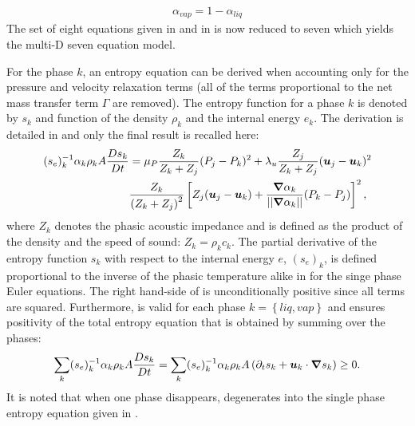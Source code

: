 %
\begin{align}
 \alpha_{vap}= 1 - \alpha_{liq}
\end{align}
%
The set of eight equations given in  and in  is now reduced to seven which yields the multi-D seven equation model.

For the phase $k$, an entropy equation can be derived when accounting only for the pressure and velocity relaxation terms (all of the terms proportional to the net mass transfer term $\Gamma$ are removed). The entropy function for a phase $k$ is denoted by $s_k$ and function of the density $\rho_k$ and the internal energy $e_k$. The derivation is detailed in  and only the final result is recalled here:
%
\begin{align}\label{eq:ent-eqn-7-eqn-model}
(s_{e})_k^{-1} \alpha_k \rho_k A \frac{Ds_k}{Dt} &= \mu_P \frac{Z_k}{Z_k+Z_j} (P_j - P_k)^2 + \lambda_u \frac{Z_j}{Z_k+Z_j} (\boldsymbol u_j -\boldsymbol u_k)^2 \nonumber
\\
& \frac{Z_k}{\left( Z_k+Z_j \right)^2} \left[ Z_j (\boldsymbol u_j-\boldsymbol u_k)+\frac{\boldsymbol{\nabla} \alpha_k}{|| \boldsymbol{\nabla} \alpha_k ||}(P_k-P_j)\right]^2,
\end{align}
where $Z_{k}$ denotes the phasic acoustic impedance and is defined as the product of the density and the speed of sound: $Z_k = \rho_k c_k$. The partial derivative of the entropy function $s_k$ with respect to the internal energy $e$, $(s_e)_k$, is defined proportional to the inverse of the phasic temperature alike in  for the singe phase Euler equations. The right hand-side of  is unconditionally positive since all terms are squared. Furthermore,  is valid for each phase $k=\left\{liq, vap \right\}$ and ensures positivity of the total entropy equation that is obtained by summing over the phases:
%
\begin{equation}\label{eq:tot-ent-res-sct4}
\sum_k (s_{e})_k^{-1} \alpha_k \rho_k A \frac{Ds_k}{Dt} = \sum_k (s_{e})_k^{-1} \alpha_k \rho_k A \left( \partial_t s_k + \boldsymbol u_k \cdot \boldsymbol{\nabla} s_k \right) \geq 0.
\end{equation}
%
It is noted that when one phase disappears,  degenerates into the single phase entropy equation given in .
